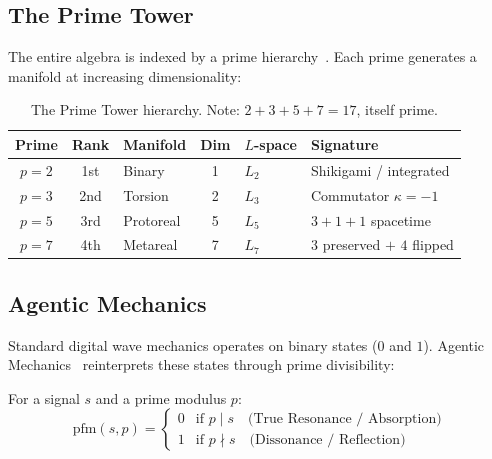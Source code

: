 \subsection{The Prime Tower}

The entire algebra is indexed by a prime hierarchy~\cite{MetarealManifold}. Each prime generates a manifold at increasing dimensionality:

\begin{table}[H]
\centering
\begin{tabular}{@{}cclcll@{}}
\toprule
\textbf{Prime} & \textbf{Rank} & \textbf{Manifold} & \textbf{Dim} & \textbf{$L$-space} & \textbf{Signature} \\
\midrule
$p=2$ & 1st & Binary & 1 & $L_2$ & Shikigami / integrated \\
$p=3$ & 2nd & Torsion & 2 & $L_3$ & Commutator $\kappa = -1$ \\
$p=5$ & 3rd & Protoreal & 5 & $L_5$ & $3 + 1 + 1$ spacetime \\
$p=7$ & 4th & Metareal & 7 & $L_7$ & $3$ preserved $+$ $4$ flipped \\
\bottomrule
\end{tabular}
\caption{The Prime Tower hierarchy. Note: $2 + 3 + 5 + 7 = 17$, itself prime.}
\end{table}

\subsection{Agentic Mechanics}

Standard digital wave mechanics operates on binary states ($0$ and $1$). Agentic Mechanics~\cite{PrimeFieldMechanics} reinterprets these states through prime divisibility:

\begin{definition}
For a signal $s$ and a prime modulus $p$:
\begin{equation}
    \text{pfm}(s, p) = \begin{cases} 0 & \text{if } p \mid s \quad \text{(True Resonance / Absorption)} \\ 1 & \text{if } p \nmid s \quad \text{(Dissonance / Reflection)} \end{cases}
\end{equation}
\end{definition}

